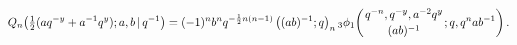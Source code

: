 \[\mathop{Q_{n}\/}\nolimits\!\left(\tfrac{1}{2}(aq^{-y}+a^{-1}q^{y});a,b\,|\,q^{%
-1}\right)=(-1)^{n}b^{n}q^{-\frac{1}{2}n(n-1)}\*\left((ab)^{-1};q\right)_{n}%
\mathop{{{}_{3}\phi_{1}}\/}\nolimits\!\left({q^{-n},q^{-y},a^{-2}q^{y}\atop(ab%
)^{-1}};q,q^{n}ab^{-1}\right).\]